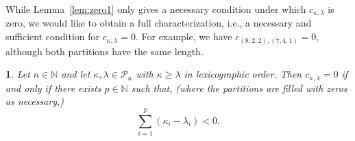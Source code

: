 \documentclass[smallextended]{svjour3}
\newtheorem{thm}{\protect\theoremname}
\providecommand{\theoremname}{Theorem}
\begin{document}
While Lemma~\ref{lem:zero1} only gives a necessary condition under which
$c_{\kappa,\lambda}$ is zero, we would like to obtain a full characterization,
i.e., a necessary and sufficient condition for $c_{\kappa,\lambda}=0$. For
example, we have $c_{(8,2,2),(7,4,1)} = 0$, although both partitions have the
same length.
\begin{thm}\label{thm:zero2}
  Let $n\in\mathbb{N}$ and let $\kappa, \lambda\in\mathcal{P}_n$  with $\kappa\geq\lambda$ in lexicographic order. Then $c_{\kappa,\lambda}=0$
  if and only if there exists $p\in\mathbb{N}$ such that,  (where the partitions are filled with zeros as necessary,)
  \begin{equation}\label{eq:prop}
    \sum_{i=1}^p (\kappa_i - \lambda_i) < 0.
  \end{equation}
\end{thm}
\end{document}
